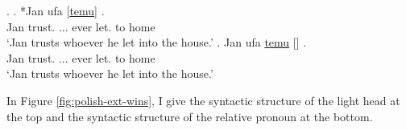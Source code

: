 \ex.
\ag. *Jan ufa [\underline{temu}] \underline{}    .\\
Jan trust.\scsub{[dat]} ... ever let.\scsub{[acc]} to home\\
`Jan trusts whoever he let into the house.' \label{ex:polish-dat-acc-rel}
\bg. Jan ufa \underline{temu} [\underline{}]    .\\
Jan trust.\scsub{[dat]} ... ever let.\scsub{[acc]} to home\\
`Jan trusts whoever he let into the house.' \label{ex:polish-dat-acc-lh}

In Figure \ref{fig:polish-ext-wins}, I give the syntactic structure of the light head at the top and the syntactic structure of the relative pronoun at the bottom.

